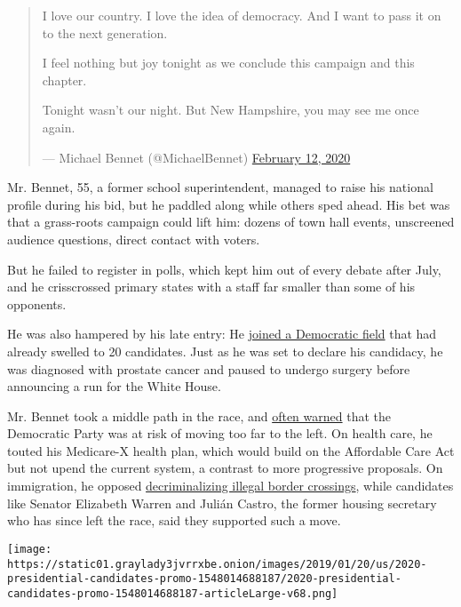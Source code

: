 \begin{quote}
I love our country. I love the idea of democracy. And I want to pass it
on to the next generation.

I feel nothing but joy tonight as we conclude this campaign and this
chapter.

Tonight wasn't our night. But New Hampshire, you may see me once again.

--- Michael Bennet (@MichaelBennet)
\href{https://twitter.com/MichaelBennet/status/1227420272476684290?ref_src=twsrc\%5Etfw}{February
12, 2020}
\end{quote}

Mr. Bennet, 55, a former school superintendent, managed to raise his
national profile during his bid, but he paddled along while others sped
ahead. His bet was that a grass-roots campaign could lift him: dozens of
town hall events, unscreened audience questions, direct contact with
voters.

But he failed to register in polls, which kept him out of every debate
after July, and he crisscrossed primary states with a staff far smaller
than some of his opponents.

He was also hampered by his late entry: He
\href{https://www.nytimes3xbfgragh.onion/2019/05/02/us/michael-bennet-president-2020.html}{joined
a Democratic field} that had already swelled to 20 candidates. Just as
he was set to declare his candidacy, he was diagnosed with prostate
cancer and paused to undergo surgery before announcing a run for the
White House.

Mr. Bennet took a middle path in the race, and
\href{https://coloradosun.com/2019/07/31/michael-bennet-president-2020-democratic-primary/}{often
warned} that the Democratic Party was at risk of moving too far to the
left. On health care, he touted his Medicare-X health plan, which would
build on the Affordable Care Act but not upend the current system, a
contrast to more progressive proposals. On immigration, he opposed
\href{https://www.nytimes3xbfgragh.onion/2019/07/31/us/border-crossing-decriminalization.html}{decriminalizing
illegal border crossings}, while candidates like Senator Elizabeth
Warren and Julián Castro, the former housing secretary who has since
left the race, said they supported such a move.

\href{https://www.nytimes3xbfgragh.onion/interactive/2019/us/politics/2020-presidential-candidates.html}{}

\texttt{[image: https://static01.graylady3jvrrxbe.onion/images/2019/01/20/us/2020-presidential-candidates-promo-1548014688187/2020-presidential-candidates-promo-1548014688187-articleLarge-v68.png]}

